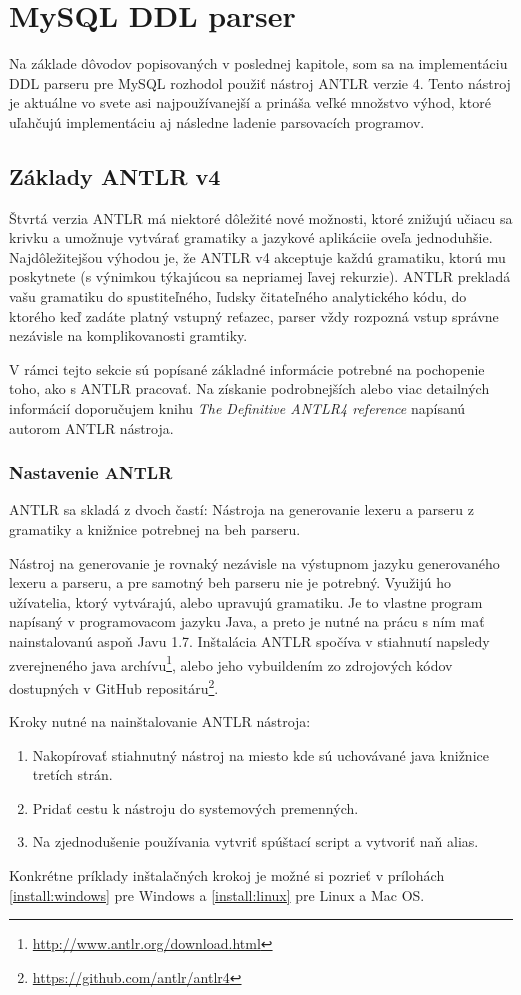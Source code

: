\chapter{MySQL DDL parser}
Na základe dôvodov popisovaných v poslednej kapitole, som sa na implementáciu DDL parseru pre MySQL rozhodol použiť nástroj ANTLR verzie 4. Tento nástroj je aktuálne vo svete asi najpoužívanejší a prináša veľké množstvo výhod, ktoré uľahčujú implementáciu aj následne ladenie parsovacích programov.

\section{Základy ANTLR v4}

Štvrtá verzia ANTLR má niektoré dôležité nové možnosti, ktoré znižujú učiacu sa krivku a umožnuje vytvárať gramatiky a jazykové aplikáciie oveľa jednoduhšie. Najdôležitejšou výhodou je, že ANTLR v4 akceptuje každú gramatiku, ktorú mu poskytnete (s výnimkou týkajúcou sa nepriamej ľavej rekurzie). ANTLR prekladá vašu gramatiku do spustiteľného, ľudsky čitateľného analytického kódu, do ktorého keď zadáte platný vstupný reťazec, parser vždy rozpozná vstup správne nezávisle na komplikovanosti gramtiky.

V rámci tejto sekcie sú popísané základné informácie potrebné na pochopenie toho, ako s ANTLR pracovať. Na získanie podrobnejších alebo viac detailných informácií doporučujem knihu \textit{The Definitive ANTLR4 reference}\cite{definitiveANTLR} napísanú autorom ANTLR nástroja.

\subsection{Nastavenie ANTLR}
ANTLR sa skladá z dvoch častí: Nástroja na generovanie lexeru a parseru z gramatiky a knižnice potrebnej na beh parseru.

Nástroj na generovanie je rovnaký nezávisle na výstupnom jazyku generovaného lexeru a parseru, a pre samotný beh parseru nie je potrebný. Využijú ho užívatelia, ktorý vytvárajú, alebo upravujú gramatiku. Je to vlastne program napísaný v programovacom jazyku Java, a preto je nutné na prácu s ním mať nainstalovanú aspoň Javu 1.7. Inštalácia ANTLR spočíva v stiahnutí napsledy zverejneného java archívu\footnote{\url{http://www.antlr.org/download.html}}, alebo jeho vybuildením zo zdrojových kódov dostupných v GitHub repositáru\footnote{\url{https://github.com/antlr/antlr4}}. 

Kroky nutné na nainštalovanie ANTLR nástroja:
\begin{enumerate}
\item Nakopírovať stiahnutný nástroj na miesto kde sú uchovávané java knižnice tretích strán.
\item Pridať cestu k nástroju do systemových premenných.
\item Na zjednodušenie používania vytvriť spúštací script a vytvoriť naň alias.
\end{enumerate}
Konkrétne príklady inštalačných krokoj je možné si pozrieť v prílohách \ref{install:windows} pre Windows a \ref{install:linux} pre Linux a Mac OS.


